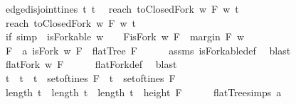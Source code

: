 \begin{isabellebody}
{\isasymand}\ edge{\isacharunderscore}disjoint{\isacharunderscore}tines\ t{}{\isacharprime}\ t{}{\isacharprime}\ \isanewline
{\isasymand}\ reach\ {\isacharparenleft}toClosedFork\ w\ F{\isacharparenright}\ w\ t{}{\isacharprime}\ {\isasymge}\ {}\ \isanewline
{\isasymand}\ reach\ {\isacharparenleft}toClosedFork\ w\ F{\isacharparenright}\ w\ t{}{\isacharprime}\ {\isasymge}\ {}{\isacharparenright}{\isachardoublequoteclose}\ \ \isanewline
%
\isadelimproof
\ \ %
\endisadelimproof
%
\isatagproof
{}\isamarkupfalse%
%
\endisatagproof
{\isafoldproof}%
%
\isadelimproof
\isanewline
%
\endisadelimproof
\ \ \isanewline
{}\isamarkupfalse%
\ if{\isacharunderscore}{}{\isacharunderscore}{}{}\ {\isacharbrackleft}simp{\isacharbrackright}{\isacharcolon}\ \ {\isachardoublequoteopen}isForkable\ w{\isachardoublequoteclose}\ \ \ {\isachardoublequoteopen}{\isacharparenleft}{\isasymexists}\ F{\isachardot}{\isacharparenleft}isFork\ w\ F\ {\isasymand}\ margin\ F\ w\ {\isasymge}\ {}{\isacharparenright}{\isacharparenright}{\isachardoublequoteclose}\isanewline
%
\isadelimproof
%
\endisadelimproof
%
\isatagproof
{}\isamarkupfalse%
\ {\isacharminus}\isanewline
\ \ \isamarkupfalse%
\ F\ \ a{\isacharcolon}\ {\isachardoublequoteopen}isFork\ w\ F\ {\isasymand}\ flatTree\ F{\isachardoublequoteclose}\isanewline
\ \ \ \ \isamarkupfalse%
\ assms\ isForkable{\isacharunderscore}def\ \isamarkupfalse%
\ blast\isanewline
\ \ \isamarkupfalse%
\ \isamarkupfalse%
\ {\isachardoublequoteopen}flatFork\ w\ F{\isachardoublequoteclose}\isanewline
\ \ \ \ \isamarkupfalse%
\ flatFork{\isacharunderscore}def\ \isamarkupfalse%
\ blast\ \isanewline
\ \ \isamarkupfalse%
\ \isamarkupfalse%
\ t{}\ \ t{}\ \ {\isachardoublequoteopen}t{}\ {\isasymin}\ set{\isacharunderscore}of{\isacharunderscore}tines\ F\ {\isasymand}\ t{}\ {\isasymin}\ set{\isacharunderscore}of{\isacharunderscore}tines\ F\ \isanewline
{\isasymand}\ length\ t{}\ {\isacharequal}\ length\ t{}\ {\isasymand}\ length\ t{}\ {\isacharequal}\ height\ F{\isachardoublequoteclose}\isanewline
\ \ \ \ \isamarkupfalse%
\ flatTree{\isachardot}simps\ a\ \isamarkupfalse%

\end{isabellebody}

